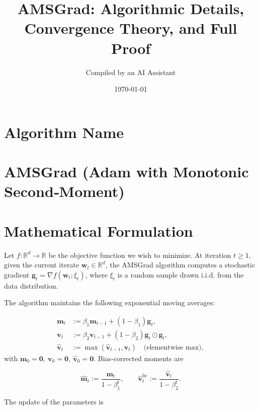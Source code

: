 \documentclass[11pt]{article}
\newcommand{\RR}{\mathbb{R}}
\begin{document}
\title{AMSGrad: Algorithmic Details, Convergence Theory, and Full Proof}
\author{Compiled by an AI Assistant}
\date{\today}
\maketitle

\tableofcontents
\newpage

\section*{Algorithm Name}
\section{AMSGrad (Adam with Monotonic Second‑Moment)}

\section{Mathematical Formulation}
\label{sec:formulation}
Let $f:\RR^{d}\rightarrow\RR$ be the objective function we wish to minimize.
At iteration $t\ge 1$, given the current iterate $\mathbf{w}_{t}\in\RR^{d}$,
the AMSGrad algorithm computes a stochastic gradient 
$\mathbf{g}_{t} = \nabla f(\mathbf{w}_{t};\xi_{t})$, where $\xi_{t}$ is a random
sample drawn i.i.d. from the data distribution.

The algorithm maintains the following exponential moving averages:

\[
\begin{aligned}
\mathbf{m}_{t} &:= \beta_{1}\mathbf{m}_{t-1} + (1-\beta_{1})\mathbf{g}_{t},
\\[4pt]
\mathbf{v}_{t} &:= \beta_{2}\mathbf{v}_{t-1} + (1-\beta_{2})\mathbf{g}_{t}\odot\mathbf{g}_{t},
\\[4pt]
\hat{\mathbf{v}}_{t} &:= \max(\hat{\mathbf{v}}_{t-1},\mathbf{v}_{t})\quad\text{(elementwise max)},
\end{aligned}
\]
with $\mathbf{m}_{0}=\mathbf{0},\ \mathbf{v}_{0}=\mathbf{0},\ \hat{\mathbf{v}}_{0}=\mathbf{0}$.
Bias‑corrected moments are

\[
\hat{\mathbf{m}}_{t} := \frac{\mathbf{m}_{t}}{1-\beta_{1}^{t}},\qquad
\hat{\mathbf{v}}_{t}^{\text{bc}} := \frac{\hat{\mathbf{v}}_{t}}{1-\beta_{2}^{t}}.
\]

The update of the parameters is
\end{document}
